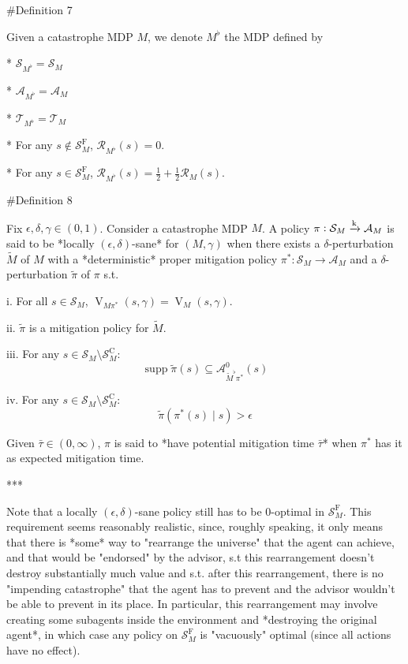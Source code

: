 \documentclass[a4paper]{article}
\DeclareMathOperator{\Supp}{supp}
\newcommand{\AP}[1]{\left(#1\right)}
\newcommand{\M}{\xrightarrow{\textnormal{k}}}
\newcommand{\A}{\mathcal{A}}
\newcommand{\St}{\mathcal{S}}
\newcommand{\T}{\mathcal{T}}
\newcommand{\R}{\mathcal{R}}
\newcommand{\RMC}{\mathrm{C}}
\newcommand{\RMF}{\mathrm{F}}
\newcommand{\SF}{\St^{\RMF}}
\newcommand{\SC}{\St^{\RMC}}
\newcommand{\V}{\operatorname{V}}
\begin{document}
\#Definition 7

Given a catastrophe MDP $M$, we denote $M^\flat$ the MDP defined by

* $\St_{M^\flat} = \St_M$

* $\A_{M^\flat} = \A_M$

* $\T_{M^\flat} = \T_M$

* For any $s\not\in\SF_M$, $\R_{M^\flat}(s) = 0$.

* For any $s \in \SF_M$, $\R_{M^\flat}(s) = \frac{1}{2} + \frac{1}{2}\R_M(s)$.

\#Definition 8

Fix $\epsilon,\delta,\gamma \in (0,1)$. Consider a catastrophe MDP $M$. A policy $\pi: \St_M \M \A_M$ is said to be *locally $(\epsilon,\delta)$-sane* for $(M,\gamma)$ when there exists a $\delta$-perturbation $\tilde{M}$ of $M$ with a *deterministic* proper mitigation policy $\pi^*: \St_M \rightarrow \A_M$ and a $\delta$-perturbation $\tilde{\pi}$ of $\pi$ s.t.

i. For all $s \in \St_M$, $\V_{M\pi^*}(s,\gamma) = \V_M(s,\gamma)$.

ii. $\tilde{\pi}$ is a mitigation policy for $\tilde{M}$.

iii. For any $s \in \St_M \setminus \SC_M$: $$\Supp{\tilde{\pi}(s)} \subseteq \A_{\tilde{M}^\flat\pi^*}^0(s)$$

iv. For any $s \in \St_M \setminus \SC_M$: $$\tilde{\pi}\AP{\pi^*(s) \mid s} > \epsilon$$


Given $\bar{\tau} \in (0,\infty)$, $\pi$ is said to *have potential mitigation time $\bar{\tau}$* when $\pi^*$ has it as expected mitigation time.

***

Note that a locally $(\epsilon,\delta)$-sane policy still has to be $0$-optimal in $\SF_M$. This requirement seems reasonably realistic, since, roughly speaking, it only means that there is *some* way to "rearrange the universe" that the agent can achieve, and that would be "endorsed" by the advisor, s.t this rearrangement doesn't destroy substantially much value and s.t. after this rearrangement, there is no "impending catastrophe" that the agent has to prevent and the advisor wouldn't be able to prevent in its place. In particular, this rearrangement may involve creating some subagents inside the environment and *destroying the original agent*, in which case any policy on $\SF_M$ is "vacuously" optimal (since all actions have no effect).
\end{document}
